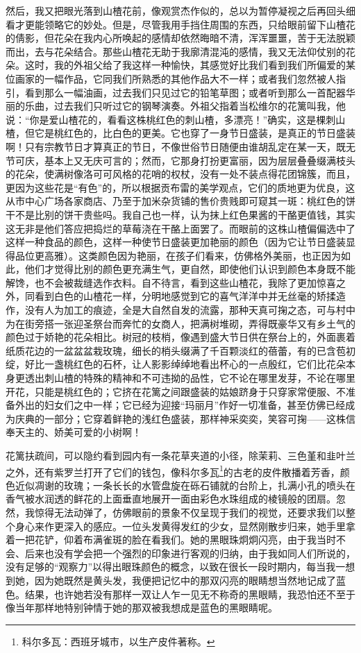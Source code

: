 \par 然后，我又把眼光落到山楂花前，像观赏杰作似的，总以为暂停凝视之后再回头细看才更能领略它的妙处。但是，尽管我用手挡住周围的东西，只给眼前留下山楂花的倩影，但花朵在我内心所唤起的感情却依然晦暗不清，浑浑噩噩，苦于无法脱颖而出，去与花朵结合。那些山楂花无助于我廓清混沌的感情，我又无法仰仗别的花朵。这时，我的外祖父给了我这样一种愉快，其感觉好比我们看到我们所偏爱的某位画家的一幅作品，它同我们所熟悉的其他作品大不一样；或者我们忽然被人指引，看到那么一幅油画，过去我们只见过它的铅笔草图；或者听到那么一首配器华丽的乐曲，过去我们只听过它的钢琴演奏。外祖父指着当松维尔的花篱叫我，他说：“你是爱山楂花的，看看这株桃红色的刺山楂，多漂亮！”确实，这是棵刺山楂，但它是桃红色的，比白色的更美。它也穿了一身节日盛装，是真正的节日盛装啊！只有宗教节日才算真正的节日，不像世俗节日随便由谁胡乱定在某一天，既无节可庆，基本上又无庆可言的；然而，它那身打扮更富丽，因为层层叠叠缀满枝头的花朵，使满树像洛可可风格的花哨的权杖，没有一处不装点得花团锦簇，而且，更因为这些花是“有色”的，所以根据贡布雷的美学观点，它们的质地更为优良，这从市中心广场各家商店、乃至于加米杂货铺的售价贵贱即可窥其一斑：桃红色的饼干不是比别的饼干贵些吗。我自己也一样，认为抹上红色果酱的干酪更值钱，其实这无非是他们答应把捣烂的草莓浇在干酪上面罢了。而眼前的这株山楂偏偏选中了这样一种食品的颜色，这样一种使节日盛装更加艳丽的颜色（因为它让节日盛装显得品位更高雅）。这类颜色因为艳丽，在孩子们看来，仿佛格外美丽，也正因为如此，他们才觉得比别的颜色更充满生气，更自然，即使他们认识到颜色本身既不能解馋，也不会被裁缝选作衣料。自不待言，看到这些山楂花，我除了更加惊喜之外，同看到白色的山楂花一样，分明地感觉到它的喜气洋洋中并无丝毫的矫揉造作，没有人为加工的痕迹，全是大自然自发的流露，那种天真可掬之态，可与村中为在街旁搭一张迎圣祭台而奔忙的女商人，把满树堆砌，弄得既豪华又有乡土气的颜色过于娇艳的花朵相比。树冠的枝梢，像遇到盛大节日供在祭台上的，外面裹着纸质花边的一盆盆盆栽玫瑰，细长的梢头缀满了千百颗淡红的蓓蕾，有的已含苞初绽，好比一盏桃红色的石杯，让人影影绰绰地看出杯心的一点殷红，它们比花朵本身更透出刺山楂的特殊的精神和不可违拗的品性，它不论在哪里发芽，不论在哪里开花，只能是桃红色的；它挤在花篱之间跟盛装的姑娘跻身于只穿家常便服、不准备外出的妇女们之中一样；它已经为迎接“玛丽月”作好一切准备，甚至仿佛已经成为庆典的一部分；它穿着鲜艳的浅红色盛装，那样神采奕奕，笑容可掬——这株信奉天主的、娇美可爱的小树啊！
\par 花篱扶疏间，可以隐约看到园内有一条花草夹道的小径，除茉莉、三色堇和韭叶兰之外，还有紫罗兰打开了它们的钱包，像科尔多瓦\footnote{科尔多瓦：西班牙城市，以生产皮件著称。}的古老的皮件散播着芳香，颜色近似凋谢的玫瑰；一条长长的水管盘旋在砾石铺就的台阶上，扎满小孔的喷头在香气被水润透的鲜花的上面垂直地展开一面由彩色水珠组成的棱镜般的团扇。忽然，我惊得无法动弹了，仿佛眼前的景象不仅呈现于我们的视觉，还要求我们以整个身心来作更深入的感应。一位头发黄得发红的少女，显然刚散步归来，她手里拿着一把花铲，仰着布满雀斑的脸在看我们。她的黑眼珠炯炯闪亮，由于我当时不会、后来也没有学会把一个强烈的印象进行客观的归纳，由于我如同人们所说的，没有足够的“观察力”以得出眼珠颜色的概念，以致在很长一段时期内，每当我一想到她，因为她既然是黄头发，我便把记忆中的那双闪亮的眼睛想当然地记成了蓝色。结果，也许她若没有那样一双让人乍一见无不称奇的黑眼睛，我恐怕还不至于像当年那样地特别钟情于她的那双被我想成是蓝色的黑眼睛呢。
